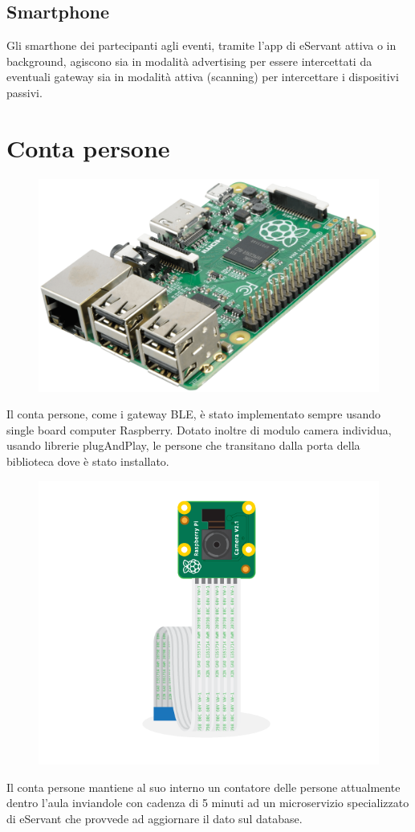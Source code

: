 \subsection{Smartphone}
Gli smarthone dei partecipanti agli eventi, tramite l'app di eServant attiva o in background, agiscono
sia in modalità advertising per essere intercettati da eventuali gateway sia in modalità attiva (scanning) per 
intercettare i dispositivi passivi.

\section{Conta persone}

\begin{figure}[H]
    \centering  
    \includegraphics[scale=0.2]{img/cap4/raspberry}
\end{figure}


Il conta persone, come i gateway BLE, è stato implementato sempre usando single board computer
Raspberry.
Dotato inoltre di modulo camera individua, usando librerie plugAndPlay, le persone che transitano 
dalla porta della biblioteca dove è stato installato.

\begin{figure}[H]
    \centering  
    \includegraphics[scale=0.2]{img/cap4/camera}
\end{figure}

Il conta persone mantiene al suo interno un contatore delle persone attualmente dentro l'aula
inviandole con cadenza di 5 minuti ad un microservizio specializzato di eServant che provvede ad
aggiornare il dato sul database.